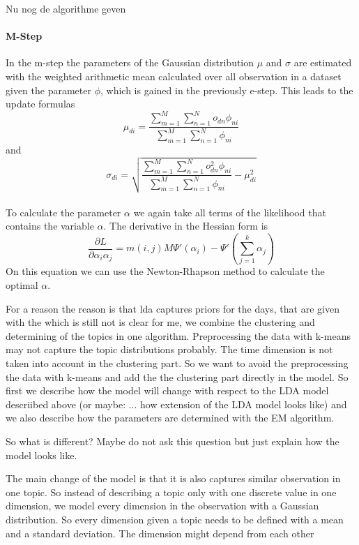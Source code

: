 \documentclass[11pt,a4paper]{article}
\begin{document}
  Nu nog de algorithme geven

  \paragraph{M-Step}
  
In the m-step the parameters of the Gaussian distribution $\mu$ and $\sigma$ are estimated with the weighted arithmetic mean calculated over all observation in a dataset given the parameter $\phi$, which is gained in the previously e-step. This leads to the update formulas
\begin{equation}
 \mu_{di} = \frac{\sum_{m=1}^M \sum_{n=1}^N o_{dn} \phi_{ni} }{\sum_{m=1}^M \sum_{n=1}^N  \phi_{ni}}
\end{equation}
and
\begin{equation}
 \sigma_{di} = \sqrt{\frac{\sum_{m=1}^M \sum_{n=1}^N o_{dn}^2 \phi_{ni} }{\sum_{m=1}^M \sum_{n=1}^N  \phi_{ni}} - \mu_{di}^2}
\end{equation}
\\
To calculate the parameter $\alpha$ we again take all terms of the likelihood that contains the variable $\alpha$. The derivative in the Hessian form is
\begin{equation}
 \frac{\partial L}{\partial \alpha_i\alpha_j} =  m(i,j) M \Psi'(\alpha_i) - \Psi'(\sum_{j=1}^k \alpha_j)
\end{equation}
On this equation we can use the Newton-Rhapson method to calculate the optimal $\alpha$.



For a reason 
the reason is that lda captures priors for the days, that are given with the 
which is still not is clear for me, we combine the clustering and determining of the topics in one algorithm.
Preprocessing the data with k-means may not capture the topic distributions probably. The time dimension is not taken into account in the clustering part. So we want to avoid the preprocessing the data with k-means and add the the clustering part directly in the model.
So first we describe how the model will change with respect to the LDA model descriibed above (or maybe: ... how extension of the LDA model looks like) and we also describe how the parameters are determined with the EM algorithm.


So what is different? Maybe do not ask this question but just explain how the model looks like.

The main change of the model is that it is also captures similar observation in one topic.
 So instead of describing a topic only with one discrete value in one dimension, we model every dimension in the observation with a Gaussian distribution. So every dimension given a topic needs to be defined with a mean and a standard deviation. The dimension might depend from each other
\end{document}
